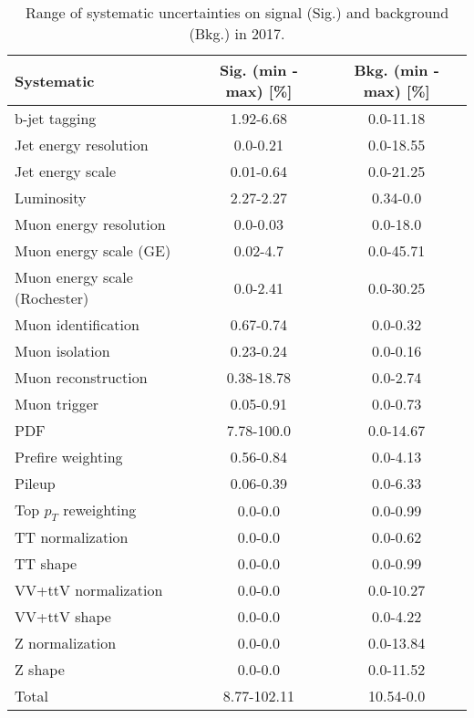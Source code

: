 \begin{table}[htbp]
\begin{center}
\caption{Range of systematic uncertainties on signal (Sig.) and background (Bkg.) in 2017.}
\begin{tabular}{lcc}
\hline\hline
Systematic					&  Sig. (min - max) [\%] &  Bkg. (min - max) [\%]  \\ \hline
b-jet tagging					& 1.92-6.68 & 0.0-11.18 \\
Jet energy resolution  		& 0.0-0.21 & 0.0-18.55 \\
Jet energy scale       		& 0.01-0.64 & 0.0-21.25 \\
Luminosity		 			& 2.27-2.27 & 0.34-0.0 \\
Muon energy resolution 		& 0.0-0.03 & 0.0-18.0 \\
Muon energy scale (GE)    	& 0.02-4.7 & 0.0-45.71 \\
Muon energy scale (Rochester)	& 0.0-2.41 & 0.0-30.25 \\
Muon identification    		& 0.67-0.74 & 0.0-0.32 \\
Muon isolation         		& 0.23-0.24 & 0.0-0.16 \\
Muon reconstruction    		& 0.38-18.78 & 0.0-2.74 \\
Muon trigger           		& 0.05-0.91 & 0.0-0.73 \\
PDF                    		& 7.78-100.0 & 0.0-14.67 \\
Prefire weighting				& 0.56-0.84 & 0.0-4.13 \\
Pileup                		& 0.06-0.39 & 0.0-6.33 \\
Top $p_T$ reweighting     	& 0.0-0.0 & 0.0-0.99 \\
TT normalization       		& 0.0-0.0 & 0.0-0.62 \\
TT shape               		& 0.0-0.0 & 0.0-0.99 \\
VV+ttV normalization          & 0.0-0.0 & 0.0-10.27 \\
VV+ttV shape          		& 0.0-0.0 & 0.0-4.22 \\
Z normalization        		& 0.0-0.0 & 0.0-13.84 \\
Z shape                		& 0.0-0.0 & 0.0-11.52 \\
Total                 		& 8.77-102.11 & 10.54-0.0 \\ \hline\hline
\end{tabular}
\label{tab:SysRanges2017}
\end{center}
\end{table}

